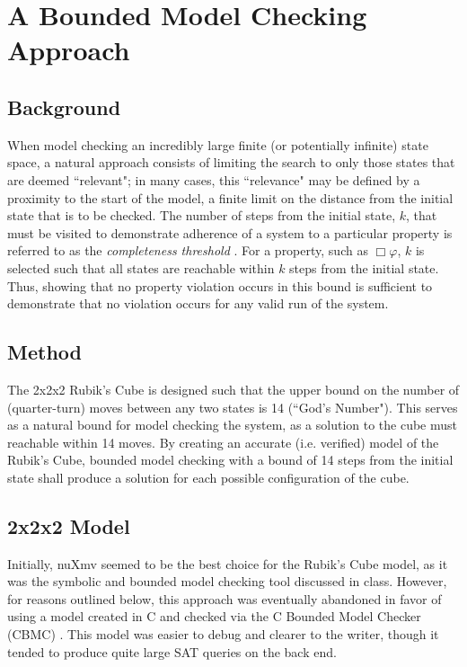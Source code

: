 \documentclass{article}
\renewcommand{\phi}{\varphi}
\newcommand{\always}{\Box}
\begin{document}
\newpage

\section{A Bounded Model Checking Approach}

\subsection{Background}
When model checking an incredibly large finite (or potentially infinite) state space, a natural approach consists of limiting the search to only those states that are deemed ``relevant"; in many cases, this ``relevance" may be defined by a proximity to the start of the model, a finite limit on the distance from the initial state that is to be checked. The number of steps from the initial state, $k$, that must be visited to demonstrate adherence of a system to a particular property is referred to as the \textit{completeness threshold} \cite{biere}. For a property, such as $\always \phi$, $k$ is selected such that all states are reachable within $k$ steps from the initial state. Thus, showing that no property violation occurs in this bound is sufficient to demonstrate that no violation occurs for any valid run of the system.

\subsection {Method}
The 2x2x2 Rubik's Cube is designed such that the upper bound on the number of (quarter-turn) moves between any two states is 14 (``God's Number"). This serves as a natural bound for model checking the system, as a solution to the cube must reachable within 14 moves. By creating an accurate (i.e. verified) model of the Rubik's Cube, bounded model checking with a bound of 14 steps from the initial state shall produce a solution for each possible configuration of the cube.

\subsection {2x2x2 Model}
Initially, nuXmv \cite{nuxmv} seemed to be the best choice for the Rubik's Cube model, as it was the symbolic and bounded model checking tool discussed in class. However, for reasons outlined below, this approach was eventually abandoned in favor of using a model created in C and checked via the C Bounded Model Checker (CBMC) \cite{cbmc}. This model was easier to debug and clearer to the writer, though it tended to produce quite large SAT queries on the back end.
\end{document}
